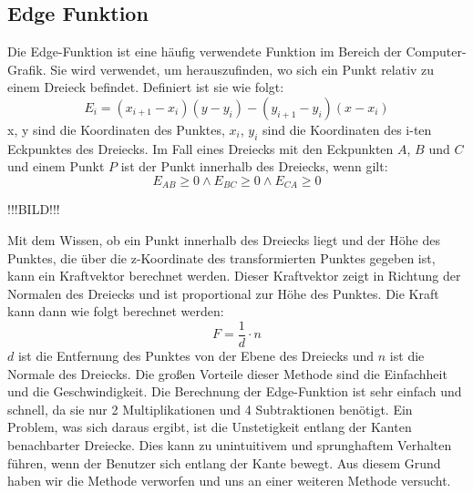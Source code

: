 \documentclass[conference]{IEEEtran}
\begin{document}
\subsection{Edge Funktion}
Die Edge-Funktion ist eine häufig verwendete Funktion im Bereich der Computer-Grafik. Sie wird 
verwendet, um herauszufinden, wo sich ein Punkt relativ zu einem Dreieck befindet. Definiert ist 
sie wie folgt:
\begin{equation}
    E_{i} = (x_{i+1} - x_{i})(y - y_{i}) - (y_{i+1} - y_{i})(x - x_{i})
\end{equation}
x, y sind die Koordinaten des Punktes, $x_{i}$, $y_{i}$ sind die Koordinaten des i-ten Eckpunktes 
des Dreiecks.
Im Fall eines Dreiecks mit den Eckpunkten $A$, $B$ und $C$ und einem Punkt $P$ ist der Punkt innerhalb 
des Dreiecks, wenn gilt:
\begin{equation}
    E_{AB} \geq 0 \land E_{BC} \geq 0 \land E_{CA} \geq 0
\end{equation}

!!!BILD!!!

Mit dem Wissen, ob ein Punkt innerhalb des Dreiecks liegt und der Höhe des Punktes, die über 
die z-Koordinate des transformierten Punktes gegeben ist, kann ein Kraftvektor berechnet werden. 
Dieser Kraftvektor zeigt in Richtung der Normalen des Dreiecks und ist proportional zur Höhe des Punktes. 
Die Kraft kann dann wie folgt berechnet werden:
\begin{equation}
    F = \frac{1}{d} \cdot n
\end{equation}
$d$ ist die Entfernung des Punktes von der Ebene des Dreiecks und $n$ ist die Normale des Dreiecks.
Die großen Vorteile dieser Methode sind die Einfachheit und die Geschwindigkeit. 
Die Berechnung der Edge-Funktion ist sehr einfach und schnell, da sie nur 2 Multiplikationen und 4 
Subtraktionen benötigt.
Ein Problem, was sich daraus ergibt, ist die Unstetigkeit entlang der Kanten benachbarter Dreiecke. 
Dies kann zu unintuitivem und sprunghaftem Verhalten führen, wenn der Benutzer sich entlang der Kante 
bewegt. Aus diesem Grund haben wir die Methode verworfen und uns an einer weiteren Methode versucht.
\end{document}
